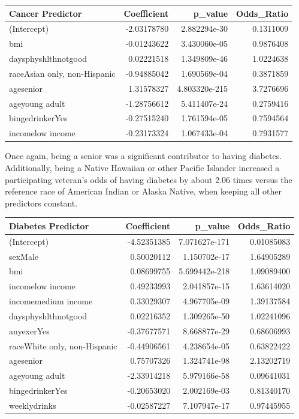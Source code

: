 \documentclass[
  10pt,
  letterpaper,
  DIV=11,
  numbers=noendperiod]{scrartcl}
\begin{document}
\begin{table}[h]
\centering
\renewcommand{\arraystretch}{0.8}
\begin{tabular}{l r r r}
\toprule
\textbf{Cancer Predictor} & Coefficient & p\_value & Odds\_Ratio \\
\midrule
(Intercept) & -2.03178780 & 2.882294e-30 & 0.1311009 \\
bmi & -0.01243622 & 3.430060e-05 & 0.9876408 \\
daysphyshlthnotgood & 0.02221518 & 1.349809e-46 & 1.0224638 \\
raceAsian only, non-Hispanic & -0.94885042 & 1.690569e-04 & 0.3871859 \\
agesenior & 1.31578327 & 4.803320e-215 & 3.7276696 \\
ageyoung adult & -1.28756612 & 5.411407e-24 & 0.2759416 \\
bingedrinkerYes & -0.27515240 & 1.761594e-05 & 0.7594564 \\
incomelow income & -0.23173324 & 1.067433e-04 & 0.7931577 \\
\bottomrule
\end{tabular}
\end{table}

Once again, being a senior was a significant contributor to having
diabetes. Additionally, being a Native Hawaiian or other Pacific
Islander increased a participating veteran's odds of having diabetes by
about 2.06 times versus the reference race of American Indian or Alaska
Native, when keeping all other predictors constant.

\begin{table}[h]
\centering
\renewcommand{\arraystretch}{0.8}
\begin{tabular}{l r r r}
\toprule
\textbf{Diabetes Predictor} & Coefficient & p\_value & Odds\_Ratio \\
\midrule
(Intercept) & -4.52351385 & 7.071627e-171 & 0.01085083 \\
sexMale & 0.50020112 & 1.150702e-17 & 1.64905289 \\
bmi & 0.08699755 & 5.699442e-218 & 1.09089400 \\
incomelow income & 0.49233993 & 2.041857e-15 & 1.63614020 \\
incomemedium income & 0.33029307 & 4.967705e-09 & 1.39137584 \\
daysphyshlthnotgood & 0.02216352 & 1.309265e-50 & 1.02241096 \\
anyexerYes & -0.37677571 & 8.668877e-29 & 0.68606993 \\
raceWhite only, non-Hispanic & -0.44906561 & 4.238654e-05 & 0.63822422 \\
agesenior & 0.75707326 & 1.324741e-98 & 2.13202719 \\
ageyoung adult & -2.33914218 & 5.979166e-58 & 0.09641031 \\
bingedrinkerYes & -0.20653020 & 2.002169e-03 & 0.81340170 \\
weeklydrinks & -0.02587227 & 7.107947e-17 & 0.97445955 \\
\bottomrule
\end{tabular}
\end{table}
\end{document}
